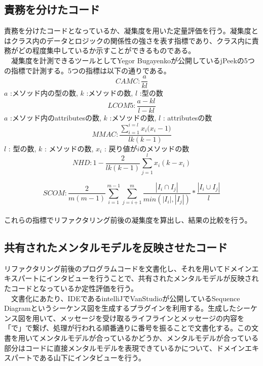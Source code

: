 \documentclass[12pt, a4paper]{jreport}
\begin{document}
\subsection{責務を分けたコード}
責務を分けたコードとなっているか、凝集度を用いた定量評価を行う。凝集度とはクラス内のデータとロジックの関係性の強さを表す指標であり、クラス内に責務がどの程度集中しているか示すことができるものである。
\\　凝集度を計測できるツールとしてYegor Bugayenkoが公開しているjPeekの5つの指標で計測する。5つの指標は以下の通りである。
\\
\begin{equation}
CAMC:
\frac{a}{kl}
\end{equation}
$a$ :メソッド内の型の数, $k$ :メソッドの数, $l$ :型の数
\begin{equation}
LCOM5:
\frac{a-kl}{l-kl}
\end{equation}
$a$ :メソッド内のattributesの数, $k$ :メソッドの数, $l$ : attributesの数
\begin{equation}
MMAC:
\frac{\sum^{i=l}_{i=1}{{x}_{i}{({x}_{i}-1})}}{lk(k-1)}
\end{equation}
$l$ : 型の数, $k$ : メソッドの数, ${x}_{i}$ : 戻り値が${i}$のメソッドの数
\begin{equation}
NHD:
1-\frac{2}{lk(k-1)}\sum^{l}_{j=1}{x}_{i}{(k-{x}_{i})}
\end{equation}

\begin{equation}
SCOM:
\frac{2}{m(m-1)}\sum^{m-1}_{i=1}\sum^{m}_{j=i+1}\frac{|{I}_{i}\cap{I}_{j}|}{min(|{I}_{i}|,|{I}_{j}|)}*\frac{|{I}_{i}\cup{I}_{j}|}{l}
\end{equation}
\\これらの指標でリファクタリング前後の凝集度を算出し、結果の比較を行う。
\subsection{共有されたメンタルモデルを反映させたコード}
リファクタリング前後のプログラムコードを文書化し、それを用いてドメインエキスパートにインタビューを行うことで、共有されたメンタルモデルが反映されたコードとなっているか定性評価を行う。
\\　文書化にあたり、IDEであるintelliJでVanStudioが公開しているSequence Diagramというシーケンス図を生成するプラグインを利用する。生成したシーケンス図を用いて、メッセージを受け取るライフラインとメッセージの内容を「で」で繋げ、処理が行われる順番通りに番号を振ることで文書化する。この文書を用いてメンタルモデルが合っているかどうか、メンタルモデルが合っている部分はコードに直接メンタルモデルを表現できているかについて、ドメインエキスパートである山下にインタビューを行う。
\end{document}
